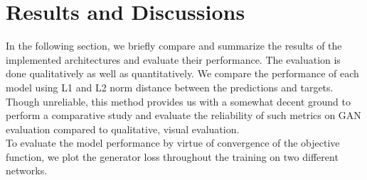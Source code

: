 \documentclass[oneside,a4paper,12pt]{report}
\begin{document}
\section{Results and Discussions}
\hspace*{0.25 in}In the following section, we briefly compare and summarize the results of the implemented architectures and evaluate their performance. The evaluation is done qualitatively as well as quantitatively. We compare the performance of each model using L1 and L2 norm distance between the predictions and targets. Though unreliable, this method provides us with a somewhat decent ground to perform a comparative study and evaluate the reliability of such metrics on GAN evaluation compared to qualitative, visual evaluation.\\
\hspace*{0.25 in}To evaluate the model performance by virtue of convergence of the objective function, we plot the generator loss throughout the training on two different networks.\\
\end{document}
